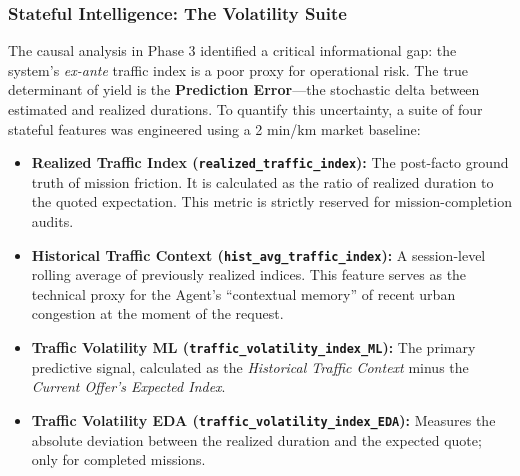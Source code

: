 \subsubsection{Stateful Intelligence: The Volatility Suite}
The causal analysis in Phase 3 identified a critical informational gap: the system's \textit{ex-ante} traffic index is a poor proxy for operational risk. The true determinant of yield is the \textbf{Prediction Error}\footnotemark---the stochastic delta between estimated and realized durations. To quantify this uncertainty, a suite of four stateful features was engineered using a 2 min/km market baseline:


\begin{itemize}[noitemsep, topsep=3pt]
    \item \textbf{Realized Traffic Index (\texttt{realized\_traffic\_index}):} The post-facto ground truth of mission friction. It is calculated as the ratio of realized duration to the quoted expectation. This metric is strictly reserved for mission-completion audits.
    \item \textbf{Historical Traffic Context (\texttt{hist\_avg\_traffic\_index}):} A session-level rolling average of previously realized indices. This feature serves as the technical proxy for the Agent's ``contextual memory'' of recent urban congestion at the moment of the request.
    \item \textbf{Traffic Volatility ML (\texttt{traffic\_volatility\_index\_ML}):} The primary predictive signal, calculated as the \textit{Historical Traffic Context} minus the \textit{Current Offer’s Expected Index}. 
    \item \textbf{Traffic Volatility EDA (\texttt{traffic\_volatility\_index\_EDA}):} Measures the absolute deviation between the realized duration and the expected quote; only for completed missions.
\end{itemize}


